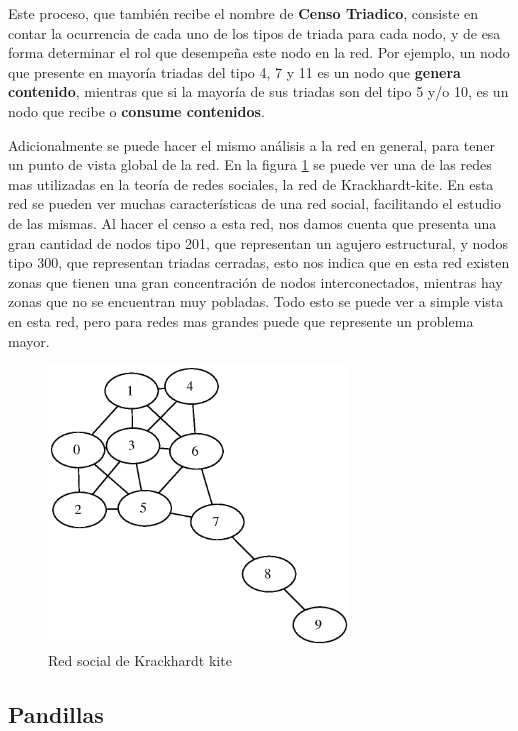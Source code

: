 Este proceso, que también recibe el nombre de \textbf{Censo Triadico}, consiste en contar la ocurrencia de cada uno de los tipos de triada para cada nodo, y de esa forma determinar el rol que desempeña este nodo en la red. Por ejemplo, un nodo que presente en mayoría triadas del tipo 4, 7 y 11 es un nodo que \textbf{genera contenido}, mientras que si la mayoría de sus triadas son del tipo 5 y/o 10, es un nodo que recibe o \textbf{consume contenidos}.

Adicionalmente se puede hacer el mismo análisis a la red en general, para tener un punto de vista global de la red. En la figura \ref{fig:red_krackhardt} se puede ver una de las redes mas utilizadas en la teoría de redes sociales, la red de Krackhardt-kite. En esta red se pueden ver muchas características de una red social, facilitando el estudio de las mismas. Al hacer el censo a esta red, nos damos cuenta que presenta una gran cantidad de nodos tipo 201, que representan un agujero estructural, y nodos tipo 300, que representan triadas cerradas, esto nos indica que en esta red existen zonas que tienen una gran concentración de nodos interconectados, mientras hay zonas que no se encuentran muy pobladas. Todo esto se puede ver a simple vista en esta red, pero para redes mas grandes puede que represente un problema mayor.

\begin{figure}[!htb]
  \begin{center}
    \includegraphics[width=8cm]{./imagenes/red_krackhardt_kite.eps}
    \caption{Red social de Krackhardt kite}
    \label{fig:red_krackhardt}
  \end{center}
\end{figure}

\subsection{Pandillas}

